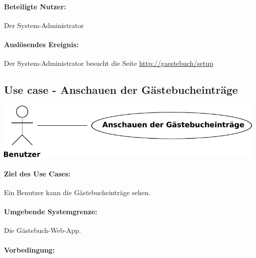 \paragraph{Beteiligte Nutzer:}

\begin{asparaitem}
\item Der System-Administrator
\end{asparaitem}

\paragraph{Auslösendes Ereignis:}

\begin{asparaitem}
\item Der System-Administrator besucht die Seite \url{http://gaestebuch/setup}
\end{asparaitem}

\subsection{Use case - Anschauen der Gästebucheinträge}

\begin{figurehere}
\includegraphics[width=\columnwidth]{use-case-show_entries}
\end{figurehere}

\paragraph{Ziel des Use Cases:}

\begin{asparaitem}
\item Ein Benutzer kann die Gästebucheinträge sehen.
\end{asparaitem}


\paragraph{Umgebende Systemgrenze:}

Die Gästebuch-Web-App.

\paragraph{Vorbedingung:}

